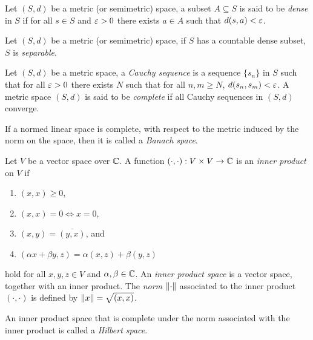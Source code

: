 \documentclass[12pt]{article}
\begin{document}
\begin{definition}
    Let $(S,d)$ be a metric (or semimetric) space, a subset $A\subseteq S$ is said to be \textit{dense} in $S$ if for all $s\in S$ and $\varepsilon > 0$ there exists $a\in A$ such that $d(s,a)<\varepsilon$.
\end{definition}
\begin{definition}
    Let $(S,d)$ be a metric (or semimetric) space, if $S$ has a countable dense subset, $S$ is \textit{separable}.
\end{definition}
\begin{definition}
    Let $(S,d)$ be a metric space, a \textit{Cauchy sequence} is a sequence $\{s_n\}$ in $S$ such that for all $\varepsilon>0$ there exists $N$ such that for all $n,m\geq N$, $d(s_n,s_m)<\varepsilon$. A metric space $(S,d)$ is said to be \textit{complete} if all Cauchy sequences in $(S,d)$ converge.
\end{definition}
\begin{definition}
    If a normed linear space is complete, with respect to the metric induced by the norm on the space, then it is called a \textit{Banach space}.
\end{definition}
\begin{definition}
    Let $V$ be a vector space over $\mathbb{C}$. A function $(\cdot,\cdot):V\times V \to \mathbb{C}$ is an \textit{inner product} on $V$ if 
    \begin{enumerate}[label=(\alph*)]
        \item $(x,x)\geq0$,
        \item $(x,x)=0 \Longleftrightarrow x=0$,
        \item $(x,y)=\overline{(y,x)}$, and
        \item $(\alpha x+\beta y,z)=\alpha (x,z)+\beta (y,z)$
    \end{enumerate}
    hold for all $x,y,z\in V$ and $\alpha,\beta\in\mathbb{C}$. An \textit{inner product space} is a vector space, together with an inner product. The \textit{norm} $\left\lVert\cdot\right\rVert$ associated to the inner product $(\cdot,\cdot)$ is defined by $\left\lVert x\right\rVert=\sqrt{(x,x)}$. 
\end{definition}
\begin{definition}
    An inner product space that is complete under the norm associated with the inner product is called a \textit{Hilbert space}.
\end{definition}
\end{document}
